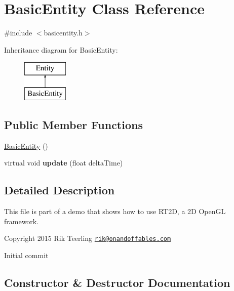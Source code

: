 \hypertarget{class_basic_entity}{}\section{Basic\+Entity Class Reference}
\label{class_basic_entity}


{\ttfamily \#include $<$basicentity.\+h$>$}

Inheritance diagram for Basic\+Entity\+:\begin{figure}[H]
\begin{center}
\leavevmode
\includegraphics[height=2.000000cm]{class_basic_entity}
\end{center}
\end{figure}
\subsection*{Public Member Functions}
\begin{DoxyCompactItemize}
\item 
\hyperlink{class_basic_entity_a49c1b0069052d75862e215bf12bcb013}{Basic\+Entity} ()
\item 
\mbox{\label{class_basic_entity_ac5113aef5520983d9939a9f3d01493eb}} 
virtual void {\bfseries update} (float delta\+Time)
\end{DoxyCompactItemize}


\subsection{Detailed Description}
This file is part of a demo that shows how to use R\+T2D, a 2D Open\+GL framework.


\begin{DoxyItemize}
\item Copyright 2015 Rik Teerling \href{mailto:rik@onandoffables.com}{\tt rik@onandoffables.\+com}
\begin{DoxyItemize}
\item Initial commit 
\end{DoxyItemize}
\end{DoxyItemize}

\subsection{Constructor \& Destructor Documentation}
\mbox{\label{class_basic_entity_a49c1b0069052d75862e215bf12bcb013}} 
